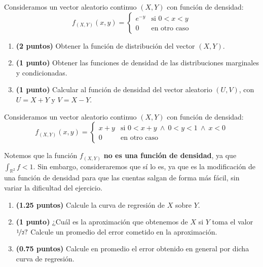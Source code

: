 \documentclass[12pt]{article}
\begin{document}
    \begin{ejercicio}[4 puntos]
        Consideramos un vector aleatorio continuo $(X,Y)$ con función de densidad:
        \begin{equation*}
            f_{(X,Y)}(x,y) = \left\{\begin{array}{ll}
                    e^{-y} & \text{si\ } 0<x<y \\
                    0 & \text{en otro caso}
            \end{array}\right.
        \end{equation*}
        \begin{enumerate}[label=\alph*)]
            \item \textbf{(2 puntos)} Obtener la función de distribución del vector $(X,Y)$.
            \item \textbf{(1 punto)} Obtener las funciones de densidad de las distribuciones marginales y condicionadas.
            \item \textbf{(1 punto)} Calcular al función de densidad del vector aleatorio $(U,V)$, con $U=X+Y$ y $V=X-Y$.
        \end{enumerate}
    \end{ejercicio}

    \begin{ejercicio}[3 puntos]
        Consideramos un vector aleatorio continuo $(X,Y)$ con función de densidad:
        \begin{equation*}
            f_{(X,Y)}(x,y) = \left\{\begin{array}{ll}
                    x+y & \text{si\ } 0<x+y \ \land\ 0<y<1\ \land \ x<0 \\
                    0 & \text{en otro caso}
            \end{array}\right.
        \end{equation*}
        \begin{observacion}
            Notemos que la función $f_{(X,Y)}$ \textbf{no es una función de densidad}, ya que $\int_{\mathbb{R}^2}f < 1$. Sin embargo, consideraremos que sí lo es, ya que es la modificación de una función de densidad para que las cuentas salgan de forma más fácil, sin variar la dificultad del ejercicio.
        \end{observacion}
        \begin{enumerate}[label=\alph*)]
            \item \textbf{(1.25 puntos)} Calcule la curva de regresión de $X$ sobre $Y$.
            \item \textbf{(1 punto)} ¿Cuál es la aproximación que obtenemos de $X$ si $Y$ toma el valor $\nicefrac{1}{2}?$ Calcule un promedio del error cometido en la aproximación.
            \item \textbf{(0.75 puntos)} Calcule en promedio el error obtenido en general por dicha curva de regresión.
        \end{enumerate}
    \end{ejercicio}
\end{document}
